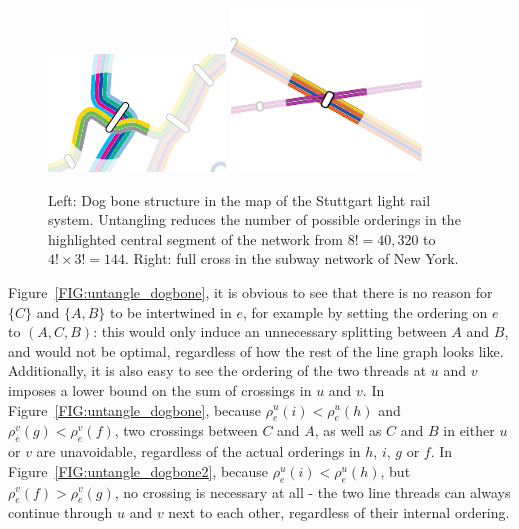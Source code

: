 \documentclass[format=acmsmall, review=false, screen=true]{acmart}
\begin{document}
\begin{figure}
  \centering
  \includegraphics[width=0.42\textwidth, page=1]{figures/untangling/vvs_dogbone.pdf}
  \hfill
  \includegraphics[width=0.45\textwidth, page=1, trim={0.2cm 0.5cm 0.2cm 0.5cm}, clip]{figures/untangling/ny_cross.pdf}
  \caption{Left: Dog bone structure in the map of the Stuttgart light rail system. Untangling reduces the number of possible orderings in the highlighted central segment of the network from $8! = 40,320$ to $4! \times 3! = 144$. Right: full cross in the subway network of New York.}  
  \label{FIG:untangle_dogbone_stuttgart}
\end{figure}

Figure~\ref{FIG:untangle_dogbone}, it is obvious to see that there is no reason for $\{C\}$ and $\{A, B\}$ to be intertwined in $e$, for example by setting the ordering on $e$ to $(A, C, B)$: this would only induce an unnecessary splitting between $A$ and $B$, and would not be optimal, regardless of how the rest of the line graph looks like.
Additionally, it is also easy to see the ordering of the two threads at $u$ and $v$ imposes a lower bound on the sum of crossings in $u$ and $v$.
In Figure~\ref{FIG:untangle_dogbone}, because $\rho^u_e(i) < \rho^u_e(h)$ and $\rho^v_e(g) < \rho^v_e(f)$, two crossings between $C$ and $A$, as well as $C$ and $B$ in either $u$ or $v$ are unavoidable, regardless of the actual orderings in $h$, $i$, $g$ or $f$.
In Figure~\ref{FIG:untangle_dogbone2}, because $\rho^u_e(i) < \rho^u_e(h)$, but $\rho^v_e(f) > \rho^v_e(g)$, no crossing is necessary at all - the two line threads can always continue through $u$ and $v$ next to each other, regardless of their internal ordering. 
\end{document}

